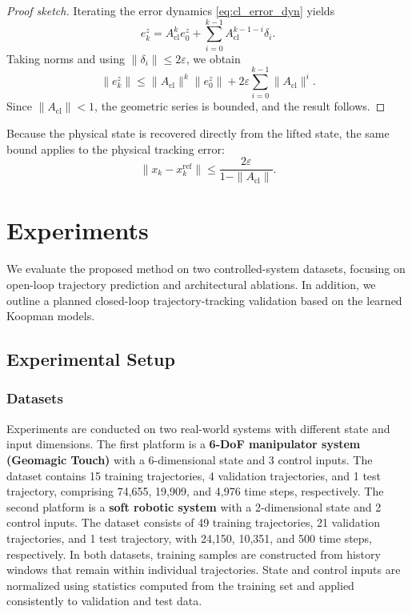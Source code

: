 \documentclass[journal]{IEEEtran}
\begin{document}
\begin{proof}[Proof sketch]
Iterating the error dynamics \eqref{eq:cl_error_dyn} yields
\[
e_k^z
=
A_{\mathrm{cl}}^k e_0^z
+
\sum_{i=0}^{k-1}
A_{\mathrm{cl}}^{k-1-i} \delta_i.
\]
Taking norms and using $\|\delta_i\| \leq 2\varepsilon$, we obtain
\[
\|e_k^z\|
\leq
\|A_{\mathrm{cl}}\|^k \|e_0^z\|
+
2\varepsilon
\sum_{i=0}^{k-1}
\|A_{\mathrm{cl}}\|^i.
\]
Since $\|A_{\mathrm{cl}}\| < 1$, the geometric series is bounded, and the result follows.
\end{proof}

Because the physical state is recovered directly from the lifted state, the same bound applies to the physical tracking error:
\begin{equation}
    \|x_k - x_k^{\mathrm{ref}}\|
    \leq
    \frac{2\varepsilon}{1 - \|A_{\mathrm{cl}}\|}.
    \label{eq:phys_bound}
\end{equation}


\section{Experiments}
\label{sec:experiments}

We evaluate the proposed method on two controlled-system datasets, focusing on open-loop trajectory prediction and architectural ablations. In addition, we outline a planned closed-loop trajectory-tracking validation based on the learned Koopman models.

\subsection{Experimental Setup}

\subsubsection{Datasets}

Experiments are conducted on two real-world systems with different state and input dimensions. The first platform is a \textbf{6-DoF manipulator system (Geomagic Touch)} with a 6-dimensional state and 3 control inputs. The dataset contains 15 training trajectories, 4 validation trajectories, and 1 test trajectory, comprising 74,655, 19,909, and 4,976 time steps, respectively. The second platform is a \textbf{soft robotic system} with a 2-dimensional state and 2 control inputs. The dataset consists of 49 training trajectories, 21 validation trajectories, and 1 test trajectory, with 24,150, 10,351, and 500 time steps, respectively. In both datasets, training samples are constructed from history windows that remain within individual trajectories. State and control inputs are normalized using statistics computed from the training set and applied consistently to validation and test data.
\end{document}
